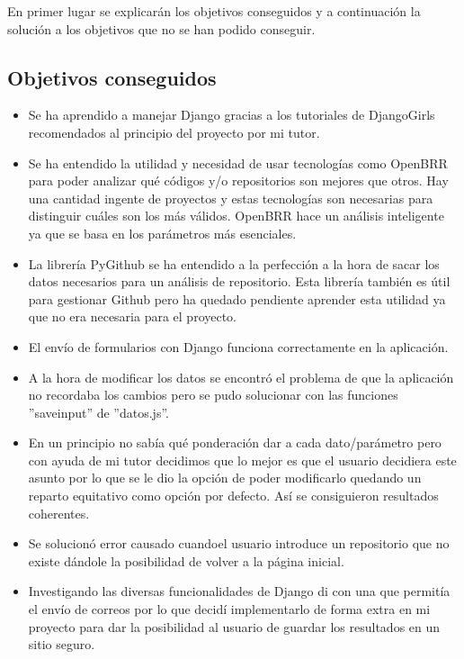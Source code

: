 \documentclass[a4paper, 12pt]{book}
\begin{document}
En primer lugar se explicarán los objetivos conseguidos y a continuación la solución a los objetivos que no se han podido conseguir.

\subsection{Objetivos conseguidos}

\begin{itemize}
	\item Se ha aprendido a manejar Django gracias a los tutoriales de DjangoGirls recomendados al principio del proyecto por mi tutor.
	\item Se ha entendido la utilidad y necesidad de usar tecnologías como OpenBRR para poder analizar qué códigos y/o repositorios son mejores que otros. Hay una cantidad ingente de proyectos y estas tecnologías son necesarias para distinguir cuáles son los más válidos. OpenBRR hace un análisis inteligente ya que se basa en los parámetros más esenciales.
	\item La librería PyGithub se ha entendido a la perfección a la hora de sacar los datos necesarios para un análisis de repositorio. Esta librería también es útil para gestionar Github pero ha quedado pendiente aprender esta utilidad ya que no era necesaria para el proyecto.
	\item El envío de formularios con Django funciona correctamente en la aplicación.
	\item A la hora de modificar los datos se encontró el problema de que la aplicación no recordaba los cambios pero se pudo solucionar con las funciones ''save\textunderscore input'' de ''datos.js''.
	\item En un principio no sabía qué ponderación dar a cada dato/parámetro pero con ayuda de mi tutor decidimos que lo mejor es que el usuario decidiera este asunto por lo que se le dio la opción de poder modificarlo quedando un reparto equitativo como opción por defecto. Así se consiguieron resultados coherentes.
	\item Se solucionó error causado cuandoel usuario introduce un repositorio que no existe dándole la posibilidad de volver a la página inicial.
	\item Investigando las diversas funcionalidades de Django di con una que permitía el envío de correos por lo que decidí implementarlo de forma extra en mi proyecto para dar la posibilidad al usuario de guardar los resultados en un sitio seguro.
\end{itemize}
\end{document}
